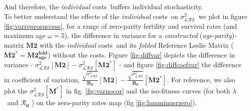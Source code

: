 \documentclass[10pt,a4paper]{article}
\newcommand{\M}{$\mathbf{M}$}
\newcommand{\lam}{$\lambda$}
\newcommand{\Rzero}{$\boldsymbol{\mathcal{R}_{0}}$  }
\newcommand{\PCoR}{\emph{individual} costs}
\newcommand{\TLA}{Trait Level Analysis}
\newcommand{\vLRO}{$\sigma_{\mathrm{\mathcal{LRS}}}^2$}
\newcommand{\vd}{$\sigma_{\mathrm{d}}^2$}
\begin{document}
And therefore, the \PCoR\ buffers individual stochasticity.\\

To better understand the effects of the \PCoR\ on \vLRO\, we plot in figure  \ref{fig:varreprosuccess}, for a range of zero-parity fertility and survival rates (and maximum age $\omega=5$), the difference in variance for a \emph{constructed} (\emph{age}-\emph{parity})-matrix $\mathbf{M2}$ with the \PCoR\ and its \emph{folded} Reference Leslie Matrix ($\mathbf{M2^{*}}=\mathbf{M2^{fold}_{age}}$) without the costs. Figure  \ref{fig:diffvar} depicts the difference in variance - $ 
 \sigma^{2}_{\mathcal{LRS}}\left[ \mathbf{M2}\right] -\sigma^{2}_{\mathcal{LRS}}\left[ \mathbf{M2^{*}}\right]$ - and figure \ref{fig:diffcoefvar} the difference in coefficient of variation, $ 
\frac{\sqrt{\sigma^{2}_{\mathcal{LRS}}} }{\mathbf{R_{0}}}\left[ \mathbf{M2}\right] -\frac{\sqrt{\sigma^{2}_{\mathcal{LRS}}} }{\mathbf{R_{0}}}\left[ \mathbf{M2^{*}}\right]$. For reference, we also plot the $\sigma^{2}_{\mathcal{LRS}}\left[ \mathbf{M^{*}}\right]$ in fig. \ref{fig:varnocor} and the iso-fitness curves (for both \lam\ and \Rzero) on the zero-parity rates map (fig \ref{fig:lamminusrzero}).\\
\end{document}
